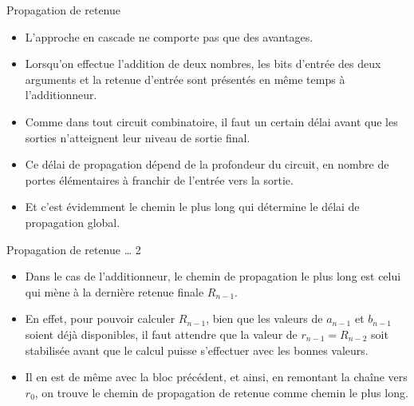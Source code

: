\documentclass[presentation]{beamer}
\begin{document}
\begin{frame}[label={sec:orgf167806}]{Propagation de retenue}
\begin{itemize}
\item L'approche en cascade ne comporte pas que des avantages.

\item Lorsqu'on effectue l'addition de deux nombres, les bits d'entrée des deux arguments et la retenue d'entrée sont présentés en même temps à l'additionneur.

\item Comme dans tout circuit combinatoire, il faut un certain délai avant que les sorties n'atteignent leur niveau de sortie final.

\item Ce délai de propagation dépend de la profondeur du circuit, en nombre de portes élémentaires à franchir de l'entrée vers la sortie.

\item Et c'est évidemment le chemin le plus long qui détermine le délai de propagation global.
\end{itemize}
\end{frame}

\begin{frame}[label={sec:orgecbdfd6}]{Propagation de retenue \ldots{} 2}
\begin{itemize}
\item Dans le cas de l'additionneur, le chemin de propagation le plus long est celui qui mène à la dernière retenue finale \(R_{n-1}\).

\item En effet, pour pouvoir calculer \(R_{n-1}\), bien que les valeurs de \(a_{n-1}\) et \(b_{n-1}\) soient déjà disponibles, il faut attendre que la valeur de \(r_{n-1} = R_{n-2}\) soit stabilisée avant que le calcul puisse s'effectuer avec les bonnes valeurs.

\item Il en est de même avec la bloc précédent, et ainsi, en remontant la chaîne vers \(r_0\), on trouve le chemin de propagation de retenue comme chemin le plus long.
\end{itemize}
\end{frame}
\end{document}
